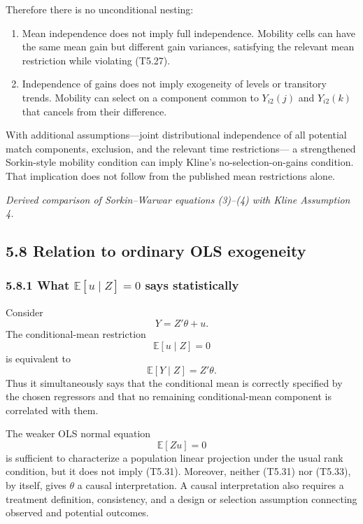 \documentclass[11pt]{article}
\begin{document}
Therefore there is no unconditional nesting:

\begin{enumerate}
\item Mean independence does not imply full independence.  Mobility cells
  can have the same mean gain but different gain variances, satisfying the
  relevant mean restriction while violating (T5.27).
\item Independence of gains does not imply exogeneity of levels or
  transitory trends.  Mobility can select on a component common to
  \(Y_{i2}(j)\) and \(Y_{i2}(k)\) that cancels from their difference.
\end{enumerate}

With additional assumptions---joint distributional independence of all
potential match components, exclusion, and the relevant time restrictions---
a strengthened Sorkin-style mobility condition can imply Kline's
no-selection-on-gains condition.  That implication does not follow from the
published mean restrictions alone.

\textit{Derived comparison of Sorkin--Warwar equations (3)--(4) with Kline
Assumption 4.}

\subsection{5.8 Relation to ordinary OLS exogeneity}

\subsubsection{5.8.1 What \(\mathbb E[u\mid Z]=0\) says statistically}

Consider
\[
Y=Z'\theta+u.
\tag{T5.30}
\]
The conditional-mean restriction
\[
\mathbb E[u\mid Z]=0
\tag{T5.31}
\]
is equivalent to
\[
\mathbb E[Y\mid Z]=Z'\theta.
\tag{T5.32}
\]
Thus it simultaneously says that the conditional mean is correctly
specified by the chosen regressors and that no remaining conditional-mean
component is correlated with them.

The weaker OLS normal equation
\[
\mathbb E[Zu]=0
\tag{T5.33}
\]
is sufficient to characterize a population linear projection under the
usual rank condition, but it does not imply (T5.31).  Moreover, neither
(T5.31) nor (T5.33), by itself, gives \(\theta\) a causal interpretation.
A causal interpretation also requires a treatment definition, consistency,
and a design or selection assumption connecting observed and potential
outcomes.
\end{document}
